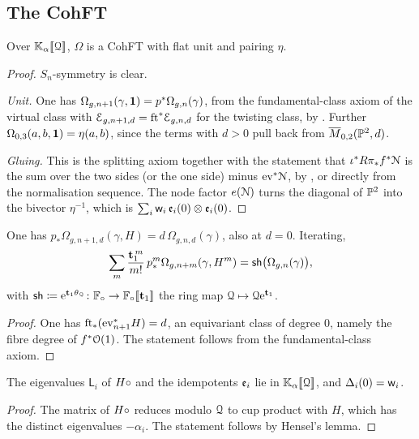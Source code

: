 \subsection{The CohFT}

\begin{lem}[Axioms]
\label{lem:gen-axioms}
Over $\mathbb{K}_{\alpha}[\![ \mathcal{Q} ]\!]$, $\Omega$ is a CohFT with flat unit and pairing $\eta$.
\end{lem}
\begin{proof}
$S_n$-symmetry is clear.

\emph{Unit.} One has $\Omega_{g,n+1}(\gamma,\mathbf{1})=p^*\Omega_{g,n}(\gamma)$, from the fundamental-class axiom of the virtual class with $\mathcal{E}_{g,n+1,d}=\mathrm{ft}^*\mathcal{E}_{g,n,d}$ for the twisting class, by \cite[App.~1 (iv)]{CG07}. Further $\Omega_{0,3}(a,b,\mathbf{1})=\eta(a,b)$, since the terms with $d>0$ pull back from $\overline{M}_{0,2}(\mathbb{P}^2,d)$.

\emph{Gluing.} This is the splitting axiom together with the statement that $\iota^*R\pi_*f^*\mathcal{N}$ is the sum over the two sides (or the one side) minus $\mathrm{ev}^*\mathcal{N}$, by \cite[App.~1 (v), (vi)]{CG07}, or directly from the normalisation sequence. The node factor $e(\mathcal{N})$ turns the diagonal of $\mathbb{P}^2$ into the bivector $\eta^{-1}$, which is $\sum_i\mathsf{w}_i\,\mathfrak{e}_i(0)\otimes\mathfrak{e}_i(0)$. 
\end{proof}

\begin{lem}
\label{lem:gen-divisor}
One has $p_*\Omega_{g,n+1,d}(\gamma,H)=d\,\Omega_{g,n,d}(\gamma)$, also at $d=0$. Iterating,
\[
\sum_m\frac{\mathbf{t}_1^{\,m}}{m!}\,p^m_*\Omega_{g,n+m}(\gamma,H^m)=\mathsf{sh}\big(\Omega_{g,n}(\gamma)\big),
\]
with $\mathsf{sh}\coloneqq\mathrm{e}^{\mathbf{t}_1\theta_{\mathcal{Q}}}\colon\mathbb{F}_{\circ}\to\mathbb{F}_{\circ}[\![ \mathbf{t}_1 ]\!]$ the ring map $\mathcal{Q}\mapsto\mathcal{Q}\mathrm{e}^{\mathbf{t}_1}$.
\end{lem}
\begin{proof}
One has $\mathrm{ft}_*(\mathrm{ev}_{n+1}^*H)=d$, an equivariant class of degree $0$, namely the fibre degree of $f^*\mathcal{O}(1)$. The statement follows from the fundamental-class axiom.
\end{proof}

\begin{lem}[Semisimplicity]
\label{lem:gen-ss}
The eigenvalues $\mathsf{L}_i$ of $H\circ$ and the idempotents $\mathfrak{e}_i$ lie in $\mathbb{K}_{\alpha}[\![ \mathcal{Q} ]\!]$, and $\Delta_i(0)=\mathsf{w}_i$.
\end{lem}
\begin{proof}
The matrix of $H\circ$ reduces modulo $\mathcal{Q}$ to cup product with $H$, which has the distinct eigenvalues $-\alpha_i$. The statement follows by Hensel's lemma.
\end{proof}

